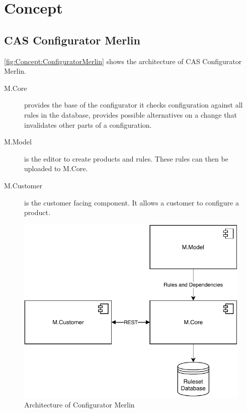 \chapter{Concept}
\label{ch:Concept}

\section{CAS Configurator Merlin}
\label{sec:Concept:ConfiguratorMerlin}

\autoref{fig:Concept:ConfiguratorMerlin} shows the architecture of CAS Configurator Merlin.
\begin{description}
    \item[M.Core] provides the base of the configurator it checks configuration against all rules in the database, provides possible alternatives on a change that invalidates other parts of a configuration.
    \item[M.Model] is the editor to create products and rules. These rules can then be uploaded to M.Core.
    \item[M.Customer] is the customer facing component. It allows a customer to configure a product.
\end{description}

\begin{figure}
    \centering
    \includegraphics{./figures/MerlinConfigurator.pdf}
    \caption{Architecture of Configurator Merlin \cite[Fig. 4.1]{raabKollaborativeProduktkonfigurationEchtzeit2019}}
    \label{fig:Concept:ConfiguratorMerlin}
\end{figure}

